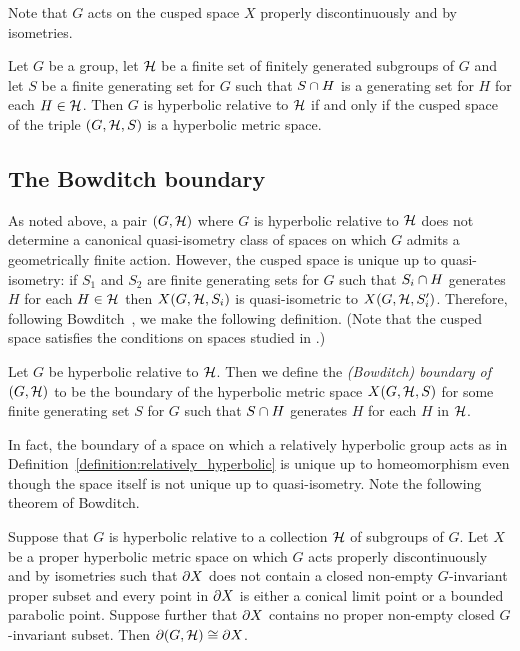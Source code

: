 Note that $G$ acts on the cusped space $X$ properly discontinuously and by isometries.

\begin{theorem}\cite[Theorem 3.25]{grovesmanning08}
  Let $G$ be a group, let $\mathcal{H}$ be a finite set of finitely generated subgroups of $G$ and let $S$ be a finite generating set for $G$ such that $S \cap H$ is a generating set for $H$ for each $H \in \mathcal{H}$.
  Then $G$ is hyperbolic relative to $\mathcal{H}$ if and only if the cusped space of the triple $(G, \mathcal{H}, S)$ is a hyperbolic metric space.
\end{theorem}

\subsection{The Bowditch boundary}\label{section:bowditch_boundary}

As noted above, a pair $(G, \mathcal{H})$ where $G$ is hyperbolic relative to $\mathcal{H}$ does not determine a canonical quasi-isometry class of spaces on which $G$ admits a  geometrically finite action.
However, the cusped space is unique up to quasi-isometry: if $S_1$ and $S_2$ are finite generating sets for $G$ such that $S_i \cap H$ generates $H$ for each $H \in \mathcal{H}$ then $X(G, \mathcal{H}, S_i)$ is quasi-isometric to $X(G, \mathcal{H}, S_i')$.
Therefore, following Bowditch~\cite{bowditch98b}, we make the following definition.
(Note that the cusped space satisfies the conditions on spaces studied in \cite[Section 6]{bowditch98b}.)

\begin{definition}\label{definition:bowditch_boundary}
  Let $G$ be hyperbolic relative to $\mathcal{H}$.
  Then we define the \emph{(Bowditch) boundary of $(G, \mathcal{H})$} to be the boundary of the hyperbolic metric space $X(G, \mathcal{H}, S)$ for some finite generating set $S$ for $G$ such that $S \cap H$ generates $H$ for each $H$ in $\mathcal{H}$.
\end{definition}

In fact, the boundary of a space on which a relatively hyperbolic group acts as in Definition~\ref{definition:relatively_hyperbolic} is unique up to homeomorphism even though the space itself is not unique up to quasi-isometry. 
Note the following theorem of Bowditch.

\begin{theorem}\cite{bowditch98b}
  Suppose that $G$ is hyperbolic relative to a collection $\mathcal{H}$ of subgroups of $G$.
  Let $X$ be a proper hyperbolic metric space on which $G$ acts properly discontinuously and by isometries such that $\partial X$ does not contain a closed non-empty $G$-invariant proper subset and every point in $\partial X$ is either a conical limit point or a bounded parabolic point.
  Suppose further that $\partial X$ contains no proper non-empty closed $G$-invariant subset.
  Then $\partial (G,\mathcal{H}) \cong \partial X$.
\end{theorem}


